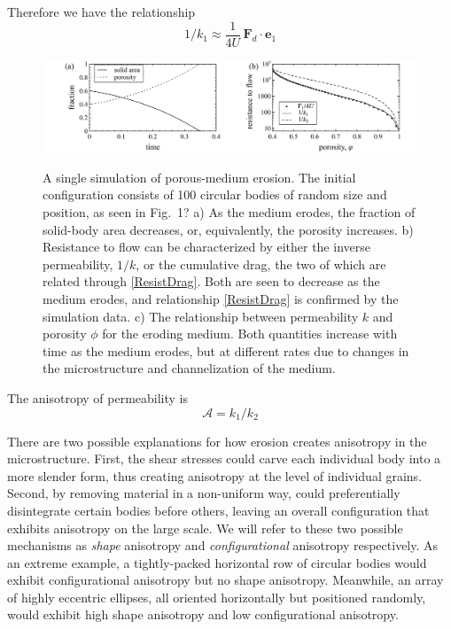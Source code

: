 \documentclass[3p]{elsarticle}
\newcommand{\bvec}[1]{\mathbf{#1}}
\newcommand{\FD}{\bvec{F}_d}
\newcommand{\ex}{ {\bvec{e}}_1}
\newcommand{\anis}{\mathcal{A}}
\begin{document}
Therefore we have the relationship
\begin{equation}
\label{ResistDrag}
1/k_1 \approx \frac{1}{4 U}  \, \FD \cdot \ex
\end{equation}

\begin{figure}%
\centering \label{fig2}
\includegraphics[width = 0.99 \textwidth]{./figs/fig2.pdf}
\caption{A single simulation of porous-medium erosion. The initial configuration consists of 100 circular bodies of random size and position, as seen in Fig.~1? a) As the medium erodes, the fraction of solid-body area decreases, or, equivalently, the porosity increases. b) Resistance to flow can be characterized by either the inverse permeability, $1/k$, or the cumulative drag, the two of which are related through \eqref{ResistDrag}. Both are seen to decrease as the medium erodes, and relationship \eqref{ResistDrag} is confirmed by the simulation data.
c) The relationship between permeability $k$ and porosity $\phi$ for the eroding medium. Both quantities increase with time as the medium erodes, but at different rates due to changes in the microstructure and channelization of the medium.
}
\end{figure}

The anisotropy of permeability is
\begin{equation}
\anis = k_1 / k_2
\end{equation}

There are two possible explanations for how erosion creates anisotropy in the microstructure. First, the shear stresses could carve each individual body into a more slender form, thus creating anisotropy at the level of individual grains. Second, by removing material in a non-uniform way, could preferentially disintegrate certain bodies before others, leaving an overall configuration that exhibits anisotropy on the large scale. We will refer to these two possible mechanisms as {\em shape} anisotropy and {\em configurational} anisotropy respectively. As an extreme example, a tightly-packed horizontal row of circular bodies would exhibit configurational anisotropy but no shape anisotropy. Meanwhile, an array of highly eccentric ellipses, all oriented horizontally but positioned randomly, would exhibit high shape anisotropy and low configurational anisotropy.
\end{document}
